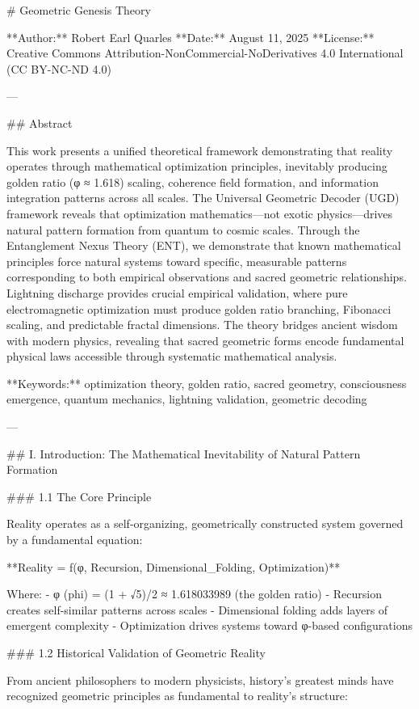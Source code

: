 # Geometric Genesis Theory 

**Author:** Robert Earl Quarles  
**Date:** August 11, 2025  
**License:** Creative Commons Attribution-NonCommercial-NoDerivatives 4.0 International (CC BY-NC-ND 4.0)

---

## Abstract

This work presents a unified theoretical framework demonstrating that reality operates through mathematical optimization principles, inevitably producing golden ratio (φ ≈ 1.618) scaling, coherence field formation, and information integration patterns across all scales. The Universal Geometric Decoder (UGD) framework reveals that optimization mathematics—not exotic physics—drives natural pattern formation from quantum to cosmic scales. Through the Entanglement Nexus Theory (ENT), we demonstrate that known mathematical principles force natural systems toward specific, measurable patterns corresponding to both empirical observations and sacred geometric relationships. Lightning discharge provides crucial empirical validation, where pure electromagnetic optimization must produce golden ratio branching, Fibonacci scaling, and predictable fractal dimensions. The theory bridges ancient wisdom with modern physics, revealing that sacred geometric forms encode fundamental physical laws accessible through systematic mathematical analysis.

**Keywords:** optimization theory, golden ratio, sacred geometry, consciousness emergence, quantum mechanics, lightning validation, geometric decoding

---

## I. Introduction: The Mathematical Inevitability of Natural Pattern Formation

### 1.1 The Core Principle

Reality operates as a self-organizing, geometrically constructed system governed by a fundamental equation:

**Reality = f(φ, Recursion, Dimensional_Folding, Optimization)**

Where:
- φ (phi) = (1 + √5)/2 ≈ 1.618033989 (the golden ratio)
- Recursion creates self-similar patterns across scales
- Dimensional folding adds layers of emergent complexity  
- Optimization drives systems toward φ-based configurations

### 1.2 Historical Validation of Geometric Reality

From ancient philosophers to modern physicists, history's greatest minds have recognized geometric principles as fundamental to reality's structure:

